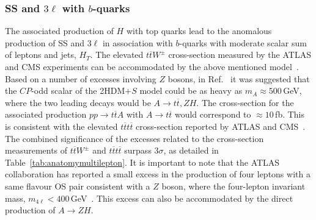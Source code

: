 \documentclass[10pt]{article}
\begin{document}
\subsubsection[SS and $3\ell$ with $b$-quarks]{\boldmath SS and $3\ell$ with $b$-quarks}
\label{sec:SS3lb}
%
The associated production of $H$ with top quarks lead to the anomalous production of SS and $3\ell$ in association with $b$-quarks with moderate scalar sum of leptons and jets, $H_T$. The elevated $t\overline{t}W^{\pm}$ cross-section measured by the ATLAS and CMS experiments can be accommodated by the above mentioned model~\cite{vonBuddenbrock:2019ajh,vonBuddenbrock:2020ter}. Based on a number of excesses involving $Z$ bosons, in Ref.~\cite{vonBuddenbrock:2018xar} it was suggested that the $CP$-odd scalar of the 2HDM+$S$ model could be as heavy as $m_A\approx500$\,GeV, where the two leading decays would be $A\rightarrow t\overline{t},ZH$. The cross-section for the associated production $pp\rightarrow t\overline{t}A$ with $A\rightarrow t\overline{t}$ would correspond to $\approx 10$\,fb. This is consistent with the elevated $t\overline{t}t\overline{t}$ cross-section reported by ATLAS and CMS~\cite{CMS:2019rvj,ATLAS:2020hpj,ATLAS:2021kqb}. The combined significance of the excesses related to the cross-section measurements of $t\overline{t}W^{\pm}$ and $t\overline{t}t\overline{t}$ surpass 3$\sigma$, as detailed in  Table~\ref{tab:anatomymultilepton}.
It is important to note that the ATLAS collaboration has reported a small excess in the production of four leptons with a same flavour OS pair consistent with a $Z$ boson, where the four-lepton invariant mass, $m_{4\ell}<400$\,GeV~\cite{ATLAS:2021wob}. This excess can also be accommodated by the direct production of $A\rightarrow ZH$.
\end{document}

